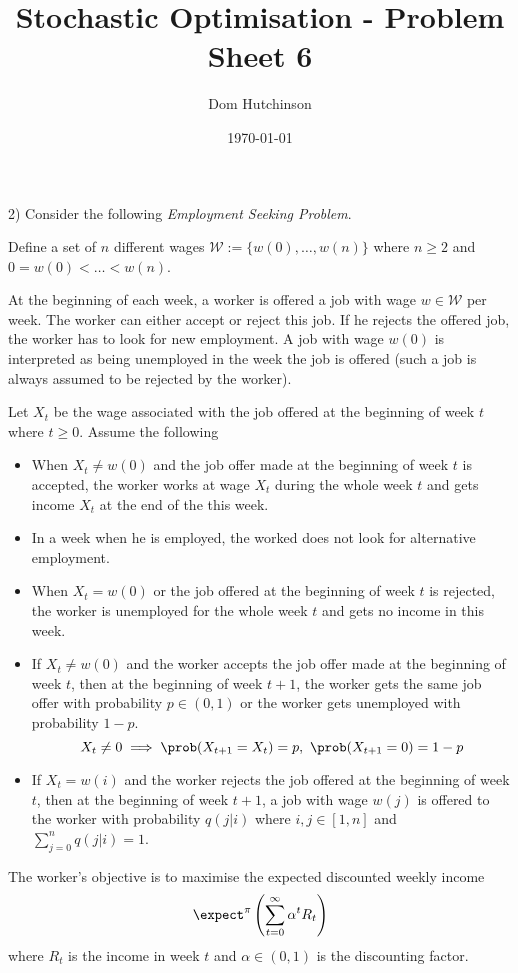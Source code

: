 \documentclass[11pt,a4paper]{article}
\begin{document}
\questionsfalse

\title{Stochastic Optimisation - Problem Sheet 6}
\author{Dom Hutchinson}
\date{\today}
\maketitle


\begin{question}{2)}
  Consider the following \textit{Employment Seeking Problem}.
  \par Define a set of $n$ different wages $\mathcal{W}:=\{w(0),\dots,w(n)\}$ where $n\geq2$ and $0=w(0)<\dots<w(n)$.
  \par At the beginning of each week, a worker is offered a job with wage $w\in\mathcal{W}$ per week. The worker can either accept or reject this job. If he rejects the offered job, the worker has to look for new employment. A job with wage $w(0)$ is interpreted as being unemployed in the week the job is offered (such a job is always assumed to be rejected by the worker).
  \par Let $X_t$ be the wage associated with the job offered at the beginning of week $t$ where $t\geq0$. Assume the following
  \begin{itemize}
    \item When $X_t\neq w(0)$ and the job offer made at the beginning of week $t$ is accepted, the worker works at wage $X_t$ during the whole week $t$ and gets income $X_t$ at the end of the this week.
    \item In a week when he is employed, the worked does not look for alternative employment.
    \item When $X_t=w(0)$ or the job offered at the beginning of week $t$ is rejected, the worker is unemployed for the whole week $t$ and gets no income in this week.
    \item If $X_t\neq w(0)$ and the worker accepts the job offer made at the beginning of week $t$, then at the beginning of week $t+1$, the worker gets the same job offer with probability $p\in(0,1)$ or the worker gets unemployed with probability $1-p$.
    \[ X_t\neq0\implies\prob(X_{t+1}=X_t)=p,\ \prob(X_{t+1}=0)=1-p \]
    \item If $X_t=w(i)$ and the worker rejects the job offered at the beginning of week $t$, then at the beginning of week $t+1$, a job with wage $w(j)$ is offered to the worker with probability $q(j|i)$ where $i,j\in[1,n]$ and $\sum_{j=0}^nq(j|i)=1$.
  \end{itemize}
  The worker's objective is to maximise the expected discounted weekly income
  \[ \expect^\pi\left(\sum_{t=0}^\infty\alpha^tR_t\right) \]
  where $R_t$ is the income in week $t$ and $\alpha\in(0,1)$ is the discounting factor.
\end{question}
\end{document}
